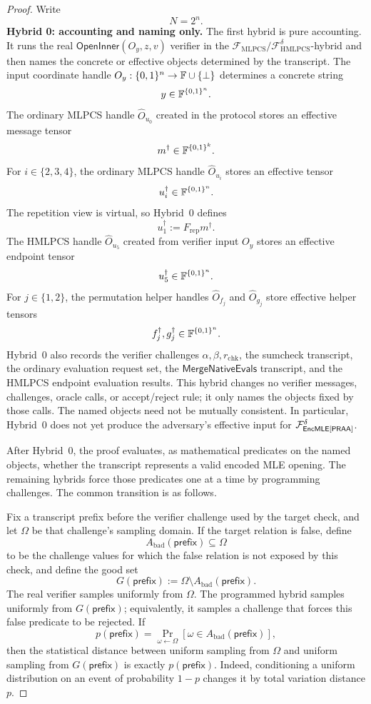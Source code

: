 \begin{proof}
Write
\[
  N=2^n.
\]
\smallskip\noindent\textbf{Hybrid 0: accounting and naming only.}
The first hybrid is pure accounting.  It runs the real
\(\mathsf{OpenInner}(O_y,z,v)\) verifier in the
\(\mathcal F_{\mathrm{MLPCS}}/\mathcal F_{\mathrm{HMLPCS}}^\delta\)-hybrid and
then names the concrete or effective objects determined by the transcript.
The input coordinate handle \(O_y:\{0,1\}^n\to\mathbb{F}\cup\{\bot\}\) determines a concrete
string
\[
  y\in\mathbb{F}^{\{0,1\}^n}.
\]
The ordinary MLPCS handle \(\widehat O_{u_0}\) created in the protocol stores
an effective message tensor
\[
  m^\dagger\in\mathbb{F}^{\{0,1\}^k}.
\]
For \(i\in\{2,3,4\}\), the ordinary MLPCS handle \(\widehat O_{u_i}\) stores an
effective tensor
\[
  u_i^\dagger\in\mathbb{F}^{\{0,1\}^n}.
\]
The repetition view is virtual, so Hybrid~0 defines
\[
  u_1^\dagger:=F_{\mathrm{rep}}m^\dagger.
\]
The HMLPCS handle \(\widehat O_{u_5}\) created from verifier input \(O_y\)
stores an effective endpoint tensor
\[
  u_5^\dagger\in\mathbb{F}^{\{0,1\}^n}.
\]
For \(j\in\{1,2\}\), the permutation helper handles
\(\widehat O_{f_j}\) and \(\widehat O_{g_j}\) store effective helper tensors
\[
  f_j^\dagger,g_j^\dagger\in\mathbb{F}^{\{0,1\}^n}.
\]
Hybrid~0 also records the verifier challenges \(\alpha,\beta,r_{\mathrm{chk}}\),
the sumcheck transcript, the ordinary evaluation request set, the
\(\mathsf{MergeNativeEvals}\) transcript, and the HMLPCS endpoint evaluation
results.  This hybrid changes no verifier messages, challenges, oracle calls,
or accept/reject rule; it only names the objects fixed by those calls.
The named objects need not be mutually consistent.  In particular, Hybrid~0
does not yet produce the adversary's effective input for
\(\mathcal F_{\mathsf{EncMLE}[\mathsf{PRAA}]}^\delta\).

After Hybrid~0, the proof evaluates, as mathematical predicates on the named
objects, whether the transcript represents a valid encoded MLE opening.  The
remaining hybrids force those predicates one at a time by programming
challenges.  The common transition is as follows.

Fix a transcript prefix before the verifier challenge used by the target check,
and let \(\Omega\) be that challenge's sampling domain.  If the target relation
is false, define
\[
  A_{\mathrm{bad}}(\mathsf{prefix})
  \subseteq \Omega
\]
to be the challenge values for which the false relation is not exposed by this
check, and define the good set
\[
  G(\mathsf{prefix})
  :=
  \Omega\setminus A_{\mathrm{bad}}(\mathsf{prefix}).
\]
The real verifier samples uniformly from \(\Omega\).  The programmed hybrid
samples uniformly from \(G(\mathsf{prefix})\); equivalently, it samples a
challenge that forces this false predicate to be rejected.  If
\[
  p(\mathsf{prefix})
  =
  \Pr_{\omega\leftarrow\Omega}
    [\omega\in A_{\mathrm{bad}}(\mathsf{prefix})],
\]
then the statistical distance between uniform sampling from \(\Omega\) and
uniform sampling from \(G(\mathsf{prefix})\) is exactly
\(p(\mathsf{prefix})\).  Indeed, conditioning a uniform distribution on an
event of probability \(1-p\) changes it by total variation distance \(p\).


\end{proof}
